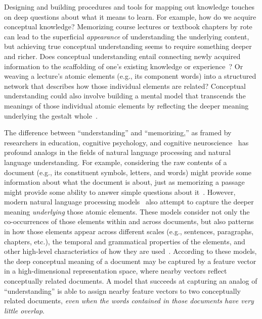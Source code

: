 \documentclass[10pt]{article}
\begin{document}
Designing and building procedures and tools for mapping out knowledge touches
on deep questions about what it means to learn. For example, how do we acquire
conceptual knowledge? Memorizing course lectures or textbook chapters by rote
can lead to the superficial \textit{appearance} of understanding the underlying
content, but achieving true conceptual understanding seems to require something
deeper and richer. Does conceptual understanding entail connecting newly
acquired information to the scaffolding of one's existing knowledge or
experience~\citep{BlayEtal06,CaraMaho03, ConsEtal16, DeacEtal04, SimoEtal04}?
Or weaving a lecture's atomic elements (e.g., its component words) into a
structured network that describes how those individual elements are related?
Conceptual understanding could also involve building a mental model that
transcends the meanings of those individual atomic elements by reflecting the
deeper meaning underlying the gestalt whole~\citep{Kint70, Macl05, ScotEtal07}.

The difference between ``understanding'' and ``memorizing,'' as framed by
researchers in education, cognitive psychology, and cognitive
neuroscience~\citep[e.g.,][]{Kato40, Gall00, ScotEtal07, HallGree08, Macl05} has
profound analogs in the fields of natural language processing and natural
language understanding. For example, considering the raw contents of a document
(e.g., its constituent symbols, letters, and words) might provide some
information about what the document is about, just as memorizing a passage
might provide some ability to answer simple questions about it~\citep[e.g., whether
it contains words related to furniture versus physics;][]{LandDuma97,
BleiEtal03, BleiLaff06}. However, modern natural language processing
models~\citep[e.g.,][]{MikoEtal13a, CerEtal18, BrowEtal20} also attempt to
capture the deeper meaning \textit{underlying} those atomic elements. These
models consider not only the co-occurrences of those elements within and across
documents, but also patterns in how those elements appear across different
scales (e.g., sentences, paragraphs, chapters, etc.), the temporal and
grammatical properties of the elements, and other high-level characteristics of
how they are used~\citep{Mann20, Mann21a}. According to these models, the deep
conceptual meaning of a document may be captured by a feature vector in a
high-dimensional representation space, where nearby vectors reflect
conceptually related documents. A model that succeeds at capturing an analog of
``understanding'' is able to assign nearby feature vectors to two conceptually
related documents, \textit{even when the words contained in those documents
have very little overlap}.
\end{document}
